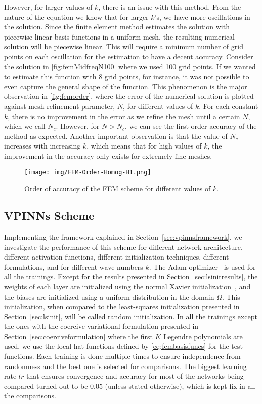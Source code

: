However, for larger values of $k$, there is an issue with this method. From the nature of the equation we know that for larger $k$'s, we have more oscillations in the solution. Since the finite element method estimates the solution with piecewise linear basis functions in a uniform mesh, the resulting numerical solution will be piecewise linear. This will require a minimum number of grid points on each oscillation for the estimation to have a decent accuracy. Consider the solution in \autoref{fig:femMidfreqN100} where we used 100 grid points. If we wanted to estimate this function with 8 grid points, for instance, it was not possible to even capture the general shape of the function. This phenomenon is the major observation in \autoref{fig:femorder}, where the error of the numerical solution is plotted against mesh refinement parameter, $N$, for different values of $k$. For each constant $k$, there is no improvement in the error as we refine the mesh until a certain $N$, which we call $N_c$. However, for $N > N_c$, we can see the first-order accuracy of the method as expected. Another important observation is that the value of $N_c$ increases with increasing $k$, which means that for high values of $k$, the improvement in the accuracy only exists for extremely fine meshes.

\begin{figure}[h!]
    \centering
    \texttt{[image: img/FEM-Order-Homog-H1.png]}
    \caption{Order of accuracy of the FEM scheme for different values of $k$.}
    \label{fig:femorder}
\end{figure}

\subsection{VPINNs Scheme}\label{sec:vpinnsresults}
Implementing the framework explained in Section~\ref{sec:vpinnsframework}, we investigate the performance of this scheme for different network architecture, different activation functions, different initialization techniques, different formulations, and for different wave numbers $k$. The Adam optimizer~\cite{adamoptimizer} is used for all the trainings. Except for the results presented in Section~\ref{sec:lsinitresults}, the weights of each layer are initialized using the normal Xavier initialization~\cite{xavierinitialization}, and the biases are initialized using a uniform distribution in the domain $\Omega$. This initialization, when compared to the least-squares initialization presented in Section~\ref{sec:lsinit}, will be called random initialization. In all the trainings except the ones with the coercive variational formulation presented in Section~\ref{sec:coerciveformulation} where the first $K$ Legendre polynomials are used, we use the local hat functions defined by \eqref{eq:fembasisfuncs} for the test functions. Each training is done multiple times to ensure independence from randomness and the best one is selected for comparisons. The biggest learning rate $lr$ that ensures convergence and accuracy for most of the networks being compared turned out to be $0.05$ (unless stated otherwise), which is kept fix in all the comparisons.

